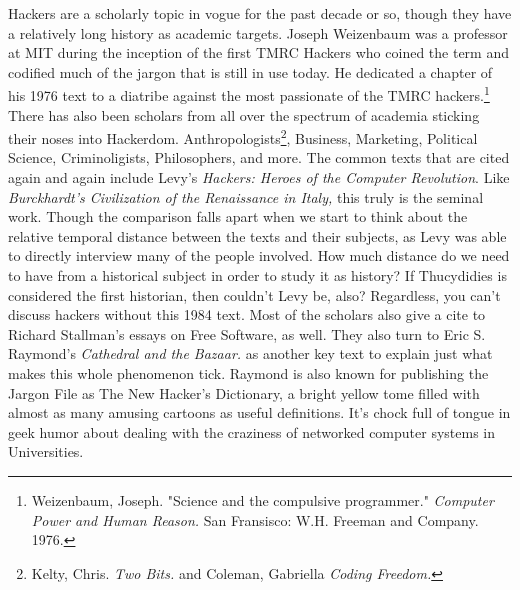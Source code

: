 \documentclass[11pt]{article}
\begin{document}
Hackers are a scholarly topic in vogue for the past decade or so, though they have a relatively long history as academic targets. Joseph Weizenbaum was a professor at MIT during the inception of the first TMRC Hackers who coined the term and codified much of the jargon that is still in use today. He dedicated a chapter of his 1976 text to a diatribe against the most passionate of the TMRC hackers.\footnote{Weizenbaum, Joseph. "Science and the compulsive programmer." \emph{Computer Power and Human Reason.} San Fransisco: W.H. Freeman and Company. 1976.} There has also been scholars from all over the spectrum of academia sticking their noses into Hackerdom. Anthropologists\footnote{Kelty, Chris. \emph{Two Bits.} and Coleman, Gabriella \emph{Coding Freedom.}}, Business, Marketing, Political Science, Criminoligists, Philosophers, and more. The common texts that are cited again and again include Levy's \emph{Hackers: Heroes of the Computer Revolution}. Like \emph{Burckhardt's Civilization of the Renaissance in Italy,} this truly is the seminal work. Though the comparison falls apart when we start to think about the relative temporal distance between the texts and their subjects, as Levy was able to directly interview many of the people involved. How much distance do we need to have from a historical subject in order to study it as history? If Thucydidies is considered the first historian, then couldn't Levy be, also? Regardless, you can't discuss hackers without this 1984 text. Most of the scholars also give a cite to Richard Stallman's essays on Free Software, as well. They also turn to Eric S. Raymond's \emph{Cathedral and the Bazaar.} as another key text to explain just what makes this whole phenomenon tick. Raymond is also known for publishing the Jargon File as The New Hacker's Dictionary, a bright yellow tome filled with almost as many amusing cartoons as useful definitions. It's chock full of tongue in geek humor about dealing with the craziness of networked computer systems in Universities.
\end{document}
